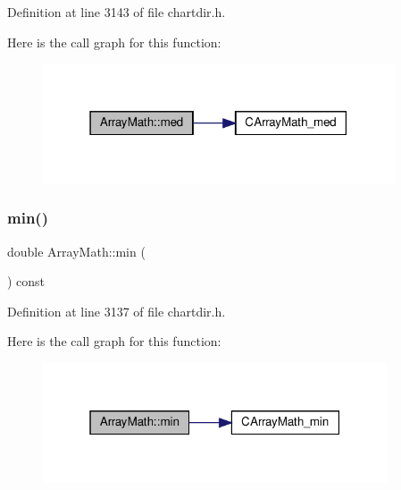 Definition at line 3143 of file chartdir.\+h.

Here is the call graph for this function\+:
\nopagebreak
\begin{figure}[H]
\begin{center}
\leavevmode
\includegraphics[width=295pt]{class_array_math_aa60ced676c9387a970df6468379d1f56_cgraph}
\end{center}
\end{figure}
\mbox{\label{class_array_math_a4ef0f497cafb78d37d4af0a6bd51d411}} 
\subsubsection{\texorpdfstring{min()}{min()}}
{\footnotesize\ttfamily double Array\+Math\+::min (\begin{DoxyParamCaption}{ }\end{DoxyParamCaption}) const\hspace{0.3cm}{\ttfamily [inline]}}



Definition at line 3137 of file chartdir.\+h.

Here is the call graph for this function\+:
\nopagebreak
\begin{figure}[H]
\begin{center}
\leavevmode
\includegraphics[width=289pt]{class_array_math_a4ef0f497cafb78d37d4af0a6bd51d411_cgraph}
\end{center}
\end{figure}
\mbox{\label{class_array_math_a0cf1a69edacfb547184b06e6c71693e6}} 
